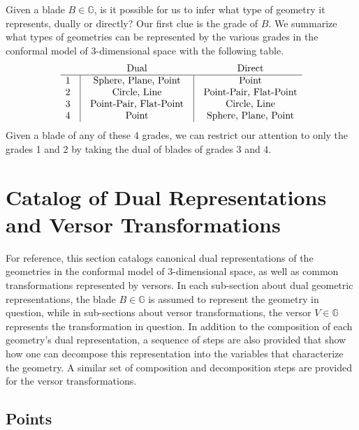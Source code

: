 \documentclass[12pt]{article}
\newcommand{\G}{\mathbb{G}}
\begin{document}
Given a blade $B\in\G$, is it possible for us to infer what type of geometry it
represents, dually or directly?  Our first clue is the grade of $B$.
We summarize what types of geometries can be represented by the various
grades in the conformal model of 3-dimensional space with the following table.
\begin{equation*}
\begin{array}{ccccc}
 &  & \mbox{Dual} & & \mbox{Direct} \\
\hline
1 & \vline & \mbox{Sphere, Plane, Point} & \vline & \mbox{Point} \\
2 & \vline & \mbox{Circle, Line} & \vline & \mbox{Point-Pair, Flat-Point} \\
3 & \vline & \mbox{Point-Pair, Flat-Point} & \vline & \mbox{Circle, Line} \\
4 & \vline & \mbox{Point} & \vline & \mbox{Sphere, Plane, Point}
\end{array}
\end{equation*}
Given a blade of any of these 4 grades, we can restrict our attention to
only the grades 1 and 2 by taking the dual of blades of grades 3 and 4.


\section{Catalog of Dual Representations and Versor Transformations}

For reference, this section catalogs canonical dual representations of the geometries in the
conformal model of 3-dimensional space, as well as common transformations represented
by versors.  In each sub-section about dual geometric representations, the blade $B\in\G$ is
assumed to represent the geometry in question, while in sub-sections about
versor transformations, the versor $V\in\G$ represents the transformation in question.
In addition to the composition
of each geometry's dual representation, a sequence of steps
are also provided that show how one can decompose this representation
into the variables that characterize the geometry.  A similar set of composition
and decomposition steps are provided for the versor transformations.

\subsection{Points}
\end{document}

